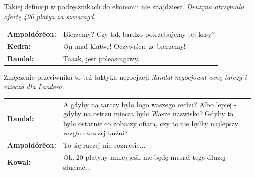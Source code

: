 \documentclass[10pt,twoside,twocolumn]{book}
\begin{document}
\begin{rpg-quotebox}{Takiej definicji w podręcznikach do ekonomii nie znajdziesz.}
   \textit{Drużyna otrzymała ofertę 490 platyn za szmaragd.}\\

   \begin{tabularx}{\columnwidth}{lX}
      \textbf{Ampoldórëon:} & Bierzemy? Czy tak bardzo potrzebujemy tej kasy?\\
      \textbf{Kedra:} & On miał klątwę! Oczywiście że bierzemy!\\
      \textbf{Randal:} & Taaak, jest poleasingowy.\\
   \end{tabularx}
\end{rpg-quotebox}


\begin{rpg-quotebox}{Zmęczenie przeciwnika to też taktyka negocjacji}
   \textit{Randal negocjował cenę tarczy i miecza dla Landera.}\\

   \begin{tabularx}{\columnwidth}{lX}
      \textbf{Randal:} & A gdyby na tarczy było logo waszego cechu? Albo lepiej - gdyby na ostrzu miecza było Wasze nazwisko? Gdyby to było ostatnie co zobaczy ofiara, czy to nie byłby najlepszy rozgłos waszej kuźni?\\
      \textbf{Ampoldórëon:} & To się raczej nie rozniesie...\\
      \textbf{Kowal:} & Ok. 20 platyny mniej jeśli nie będę musiał tego dłużej słuchać...\\
   \end{tabularx}
\end{rpg-quotebox}
\end{document}
